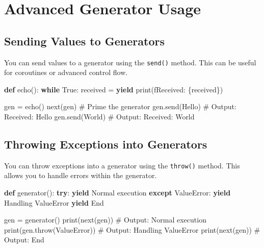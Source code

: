\documentclass[
  letterpaper,
  DIV=11,
  numbers=noendperiod]{scrreprt}
\newenvironment{Shaded}{\begin{snugshade}}{\end{snugshade}}
\newcommand{\BuiltInTok}[1]{\textcolor[rgb]{0.00,0.23,0.31}{#1}}
\newcommand{\CommentTok}[1]{\textcolor[rgb]{0.37,0.37,0.37}{#1}}
\newcommand{\ControlFlowTok}[1]{\textcolor[rgb]{0.00,0.23,0.31}{\textbf{#1}}}
\newcommand{\KeywordTok}[1]{\textcolor[rgb]{0.00,0.23,0.31}{\textbf{#1}}}
\newcommand{\NormalTok}[1]{\textcolor[rgb]{0.00,0.23,0.31}{#1}}
\newcommand{\OperatorTok}[1]{\textcolor[rgb]{0.37,0.37,0.37}{#1}}
\newcommand{\PreprocessorTok}[1]{\textcolor[rgb]{0.68,0.00,0.00}{#1}}
\newcommand{\SpecialCharTok}[1]{\textcolor[rgb]{0.37,0.37,0.37}{#1}}
\newcommand{\SpecialStringTok}[1]{\textcolor[rgb]{0.13,0.47,0.30}{#1}}
\newcommand{\StringTok}[1]{\textcolor[rgb]{0.13,0.47,0.30}{#1}}
\newcommand{\VariableTok}[1]{\textcolor[rgb]{0.07,0.07,0.07}{#1}}
\begin{document}
\section{Advanced Generator Usage}\label{advanced-generator-usage}

\subsection{Sending Values to
Generators}\label{sending-values-to-generators}

You can send values to a generator using the \texttt{send()} method.
This can be useful for coroutines or advanced control flow.

\begin{Shaded}
\begin{Highlighting}[]
\KeywordTok{def}\NormalTok{ echo():}
    \ControlFlowTok{while} \VariableTok{True}\NormalTok{:}
\NormalTok{        received }\OperatorTok{=} \ControlFlowTok{yield}
        \BuiltInTok{print}\NormalTok{(}\SpecialStringTok{f\textquotesingle{}Received: }\SpecialCharTok{\{}\NormalTok{received}\SpecialCharTok{\}}\SpecialStringTok{\textquotesingle{}}\NormalTok{)}

\NormalTok{gen }\OperatorTok{=}\NormalTok{ echo()}
\BuiltInTok{next}\NormalTok{(gen)  }\CommentTok{\# Prime the generator}
\NormalTok{gen.send(}\StringTok{\textquotesingle{}Hello\textquotesingle{}}\NormalTok{)  }\CommentTok{\# Output: Received: Hello}
\NormalTok{gen.send(}\StringTok{\textquotesingle{}World\textquotesingle{}}\NormalTok{)  }\CommentTok{\# Output: Received: World}
\end{Highlighting}
\end{Shaded}

\subsection{Throwing Exceptions into
Generators}\label{throwing-exceptions-into-generators}

You can throw exceptions into a generator using the \texttt{throw()}
method. This allows you to handle errors within the generator.

\begin{Shaded}
\begin{Highlighting}[]
\KeywordTok{def}\NormalTok{ generator():}
    \ControlFlowTok{try}\NormalTok{:}
        \ControlFlowTok{yield} \StringTok{\textquotesingle{}Normal execution\textquotesingle{}}
    \ControlFlowTok{except} \PreprocessorTok{ValueError}\NormalTok{:}
        \ControlFlowTok{yield} \StringTok{\textquotesingle{}Handling ValueError\textquotesingle{}}
    \ControlFlowTok{yield} \StringTok{\textquotesingle{}End\textquotesingle{}}

\NormalTok{gen }\OperatorTok{=}\NormalTok{ generator()}
\BuiltInTok{print}\NormalTok{(}\BuiltInTok{next}\NormalTok{(gen))  }\CommentTok{\# Output: Normal execution}
\BuiltInTok{print}\NormalTok{(gen.throw(}\PreprocessorTok{ValueError}\NormalTok{))  }\CommentTok{\# Output: Handling ValueError}
\BuiltInTok{print}\NormalTok{(}\BuiltInTok{next}\NormalTok{(gen))  }\CommentTok{\# Output: End}
\end{Highlighting}
\end{Shaded}
\end{document}
